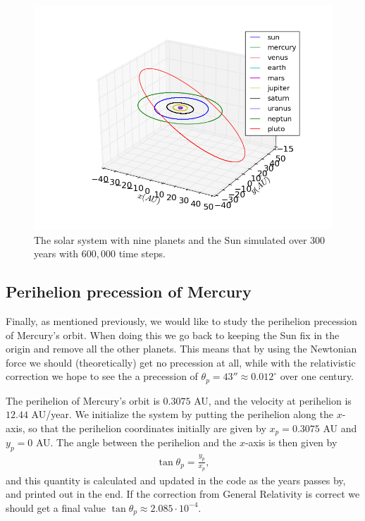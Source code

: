 \documentclass[12pt, a4paper]{article}
\begin{document}
\begin{figure}[ht!]
\begin{center}
\includegraphics[width=\textwidth]{../Programs/Output/SolarSystem_3D.png}
\caption{The solar system with nine planets and the Sun simulated over $300$ years with $600,000$ time 
steps.}
\label{fig:solarsystem}
\end{center}
\end{figure}

\subsection{Perihelion precession of Mercury}

Finally, as mentioned previously, we would like to study the perihelion precession of Mercury's orbit. 
When doing this we go back to keeping the Sun fix in the origin and remove all the other planets. 
This means that by using the 
Newtonian force we should (theoretically) get no precession at all, while with the relativistic 
correction we hope to see the a precession of $\theta_p=43''\approx 0.012^{\circ}$ over one century.

The perihelion of Mercury's orbit is $0.3075$ AU, and the velocity at perihelion is $12.44$ AU/year. 
We initialize the system by putting the perihelion along the $x$-axis, so that the perihelion 
coordinates initially are given by $x_p=0.3075$ AU and $y_p=0$ AU. The angle between the perihelion 
and the $x$-axis is then given by 
\begin{align*}
\tan\theta_p = \frac{y_p}{x_p},  
\end{align*}
and this quantity is calculated and updated in the code as the years passes by, and printed out in the 
end. If the correction from General Relativity is correct we should get a final value 
$\tan\theta_p \approx 2.085\cdot 10^{-4}$. 
\end{document}
